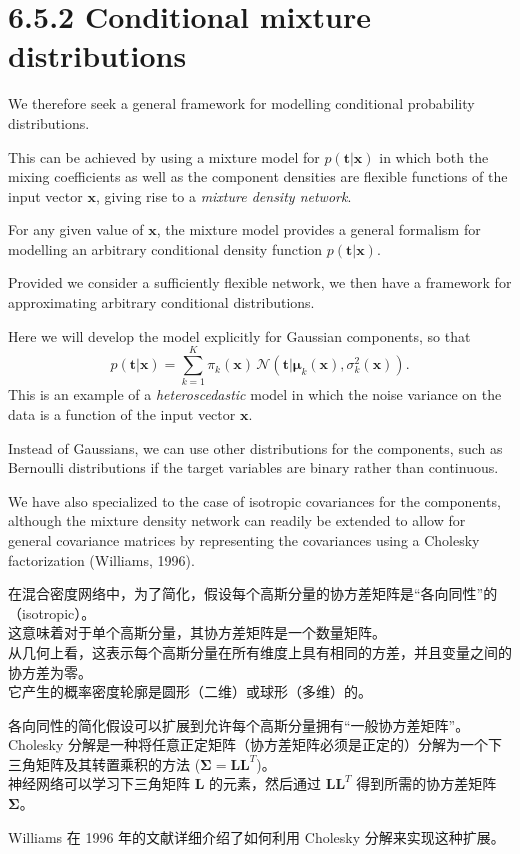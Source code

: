\documentclass{article}
\begin{document}
\section{6.5.2 Conditional mixture distributions}

We therefore seek a general framework for modelling conditional probability distributions. 

This can be achieved by using a mixture model for $p(\mathbf{t}|\mathbf{x})$ in which both the mixing coefficients as well as the component densities are flexible functions of the input vector $\mathbf{x}$, giving rise to a \emph{mixture density network}. 

For any given value of $\mathbf{x}$, the mixture model provides a general formalism for modelling an arbitrary conditional density function $p(\mathbf{t}|\mathbf{x})$. 

Provided we consider a sufficiently flexible network, we then have a framework for approximating arbitrary conditional distributions.

Here we will develop the model explicitly for Gaussian components, so that
\begin{equation}
p(\mathbf{t}|\mathbf{x}) = \sum_{k=1}^{K} \pi_k(\mathbf{x}) \,\mathcal{N}\left(\mathbf{t} \big| \boldsymbol{\mu}_k(\mathbf{x}), \sigma_k^2(\mathbf{x}) \right).
\tag{6.38}
\end{equation}
This is an example of a \emph{heteroscedastic} model in which the noise variance on the data is a function of the input vector $\mathbf{x}$. 

Instead of Gaussians, we can use other distributions for the components, such as Bernoulli distributions if the target variables are binary rather than continuous. 

We have also specialized to the case of isotropic covariances for the components, although the mixture density network can readily be extended to allow for general covariance matrices by representing the covariances using a Cholesky factorization (Williams, 1996). 

{\color{red}
在混合密度网络中，为了简化，假设每个高斯分量的协方差矩阵是“各向同性”的（isotropic）。\\
这意味着对于单个高斯分量，其协方差矩阵是一个数量矩阵。\\
从几何上看，这表示每个高斯分量在所有维度上具有相同的方差，并且变量之间的协方差为零。\\
它产生的概率密度轮廓是圆形（二维）或球形（多维）的。

各向同性的简化假设可以扩展到允许每个高斯分量拥有“一般协方差矩阵”。\\
Cholesky 分解是一种将任意正定矩阵（协方差矩阵必须是正定的）分解为一个下三角矩阵及其转置乘积的方法 ($\mathbf{\Sigma} = \mathbf{L} \mathbf{L}^T$)。\\
神经网络可以学习下三角矩阵 $\mathbf{L}$ 的元素，然后通过 $\mathbf{L} \mathbf{L}^T$ 得到所需的协方差矩阵 $\mathbf{\Sigma}$。

Williams 在 1996 年的文献详细介绍了如何利用 Cholesky 分解来实现这种扩展。
}
\end{document}
